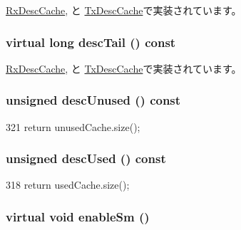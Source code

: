 \hyperlink{classIGbE_1_1RxDescCache_a465e4e31be3a89db3d7f9cd1ecc40064}{RxDescCache}, と \hyperlink{classIGbE_1_1TxDescCache_a465e4e31be3a89db3d7f9cd1ecc40064}{TxDescCache}で実装されています。\hypertarget{classIGbE_1_1DescCache_a88ebc5d9eb88ca9148465557e9a66c1c}{
\subsubsection[{descTail}]{\setlength{\rightskip}{0pt plus 5cm}virtual long descTail () const}}
\label{classIGbE_1_1DescCache_a88ebc5d9eb88ca9148465557e9a66c1c}


\hyperlink{classIGbE_1_1RxDescCache_a4b6b769be62592fc43518ba480bbd1f7}{RxDescCache}, と \hyperlink{classIGbE_1_1TxDescCache_a4b6b769be62592fc43518ba480bbd1f7}{TxDescCache}で実装されています。\hypertarget{classIGbE_1_1DescCache_a73d7e7efbb2dc6340aef1e2f3e4cb02d}{
\subsubsection[{descUnused}]{\setlength{\rightskip}{0pt plus 5cm}unsigned descUnused () const}}
\label{classIGbE_1_1DescCache_a73d7e7efbb2dc6340aef1e2f3e4cb02d}



\begin{DoxyCode}
321 { return unusedCache.size(); }
\end{DoxyCode}
\hypertarget{classIGbE_1_1DescCache_a8e6020ce06b62c70f3aaa6d6222353fb}{
\subsubsection[{descUsed}]{\setlength{\rightskip}{0pt plus 5cm}unsigned descUsed () const}}
\label{classIGbE_1_1DescCache_a8e6020ce06b62c70f3aaa6d6222353fb}



\begin{DoxyCode}
318 { return usedCache.size(); }
\end{DoxyCode}
\hypertarget{classIGbE_1_1DescCache_a9b931707aadb26e13262c50e0dd87006}{
\subsubsection[{enableSm}]{\setlength{\rightskip}{0pt plus 5cm}virtual void enableSm ()}}
\label{classIGbE_1_1DescCache_a9b931707aadb26e13262c50e0dd87006}


